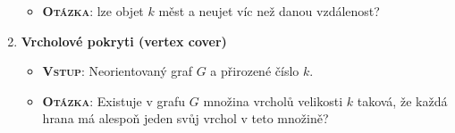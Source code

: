 \begin{enumerate}
\begin{itemize}
              \item \textbf{\textsc{Otázka}}: lze objet $k$ měst a neujet víc než danou vzdálenost?
          \end{itemize}
    \item \textbf{Vrcholové pokryti (vertex cover)}
          \begin{itemize}
              \item \textbf{\textsc{Vstup}}: Neorientovaný graf $ G $ a přirozené číslo $ k $.
              \item \textbf{\textsc{Otázka}}: Existuje v grafu $ G $ množina vrcholů velikosti $ k $ taková, že každá hrana má alespoň jeden svůj vrchol v teto množině?
          \end{itemize}
\end{enumerate}